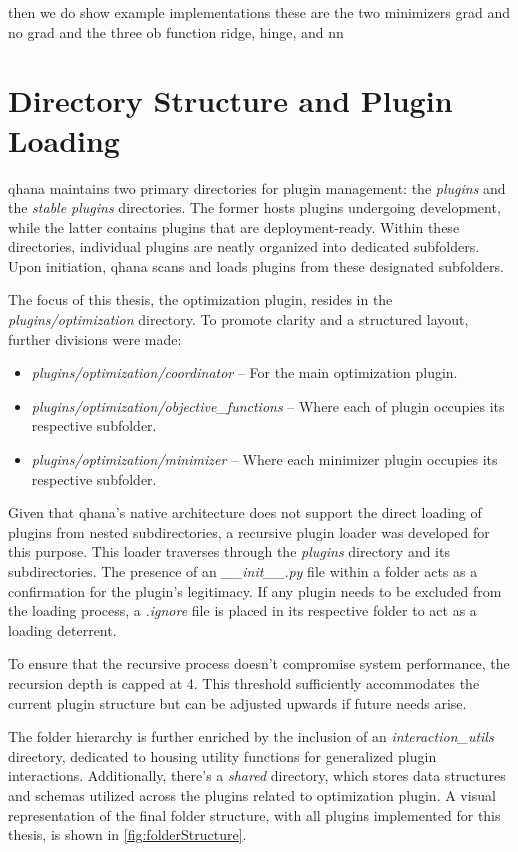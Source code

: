 \documentclass[
  a4paper,  %
  twoside,  %
  bibliography=totoc,
  headsepline,
  cleardoublepage=empty,
  parskip=half,
  draft=false
]{scrbook}
\begin{document}
then we do show example implementations
these are the two minimizers grad and no grad
and the three ob function ridge, hinge, and nn

\section{Directory Structure and Plugin Loading}
\label{sec:directoryStructure}

\gls{qhana} maintains two primary directories for plugin management: the \textit{plugins} and the \textit{stable plugins} directories.
The former hosts plugins undergoing development, while the latter contains plugins that are deployment-ready.
Within these directories, individual plugins are neatly organized into dedicated subfolders.
Upon initiation, \gls{qhana} scans and loads plugins from these designated subfolders.

The focus of this thesis, the optimization plugin, resides in the \textit{plugins/optimization} directory.
To promote clarity and a structured layout, further divisions were made:

\begin{itemize}
  \item \textit{plugins/optimization/coordinator} – For the main optimization plugin.
  \item \textit{plugins/optimization/objective\_functions} – Where each \gls{of} plugin occupies its respective subfolder.
  \item \textit{plugins/optimization/minimizer} – Where each minimizer plugin occupies its respective subfolder.
\end{itemize}

Given that \gls{qhana}'s native architecture does not support the direct loading of plugins from nested subdirectories, a recursive plugin loader was developed for this purpose.
This loader traverses through the \textit{plugins} directory and its subdirectories.
The presence of an \textit{\_\_init\_\_.py} file within a folder acts as a confirmation for the plugin's legitimacy.
If any plugin needs to be excluded from the loading process, a \textit{.ignore} file is placed in its respective folder to act as a loading deterrent.

To ensure that the recursive process doesn’t compromise system performance, the recursion depth is capped at 4.
This threshold sufficiently accommodates the current plugin structure but can be adjusted upwards if future needs arise.

The folder hierarchy is further enriched by the inclusion of an \textit{interaction\_utils} directory, dedicated to housing utility functions for generalized plugin interactions.
Additionally, there's a \textit{shared} directory, which stores data structures and schemas utilized across the plugins related to optimization plugin.
A visual representation of the final folder structure, with all plugins implemented for this thesis, is shown in \cref{fig:folderStructure}.
\end{document}
